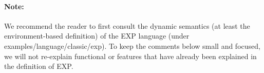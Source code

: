 \begin{latexComment}
\paragraph{Note:}{
We recommend the reader to first consult the dynamic semantics (at
least the environment-based definition) of the EXP language (under
examples/language/classic/exp).  To keep the comments below small and
focused, we will not re-explain functional or \K features that have
already been explained in the definition of EXP.
}

\end{latexComment}

\vspace*{3ex}
